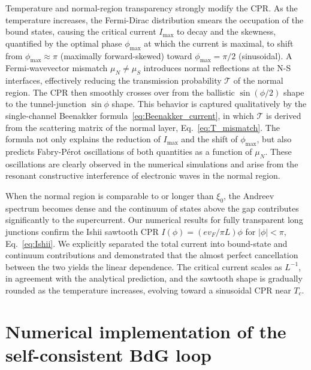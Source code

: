 \documentclass[11pt,a4paper,twoside,openany]{report}
\begin{document}
Temperature and normal-region transparency strongly modify the CPR.  As the temperature increases, the Fermi-Dirac distribution smears the occupation of the bound states, causing the critical current \(I_{\max}\) to decay and the skewness, quantified by the optimal phase \(\phi_{\max}\) at which the current is maximal, to shift from \(\phi_{\max}\approx\pi\) (maximally forward-skewed) toward \(\phi_{\max}=\pi/2\) (sinusoidal).  A Fermi-wavevector mismatch \(\mu_N\neq\mu_S\) introduces normal reflections at the N-S interfaces, effectively reducing the transmission probability \(\mathcal{T}\) of the normal region.  The CPR then smoothly crosses over from the ballistic \(\sin(\phi/2)\) shape to the tunnel-junction \(\sin\phi\) shape.  This behavior is captured qualitatively by the single-channel Beenakker formula~\eqref{eq:Beenakker_current}, in which \(\mathcal{T}\) is derived from the scattering matrix of the normal layer, Eq.~\eqref{eq:T_mismatch}.  The formula not only explains the reduction of \(I_{\max}\) and the shift of \(\phi_{\max}\), but also predicts Fabry-Pérot oscillations of both quantities as a function of \(\mu_N\). These oscillations are clearly observed in the numerical simulations and arise from the resonant constructive interference of electronic waves in the normal region.

\medskip
\noindent 
When the normal region is comparable to or longer than \(\xi_0\), the Andreev spectrum becomes dense and the continuum of states above the gap contributes significantly to the supercurrent.  Our numerical results for fully transparent long junctions confirm the Ishii sawtooth CPR \(I(\phi) = (ev_F/\pi L)\phi\) for \(|\phi|<\pi\), Eq.~\eqref{eq:Ishii}.  We explicitly separated the total current into bound-state and continuum contributions and demonstrated that the almost perfect cancellation between the two yields the linear dependence.  The critical current scales as \(L^{-1}\), in agreement with the analytical prediction, and the sawtooth shape is gradually rounded as the temperature increases, evolving toward a sinusoidal CPR near \(T_c\).






\appendix











\chapter{Numerical implementation of the self-consistent BdG loop}
\label{app:numerical implementation}
\end{document}

